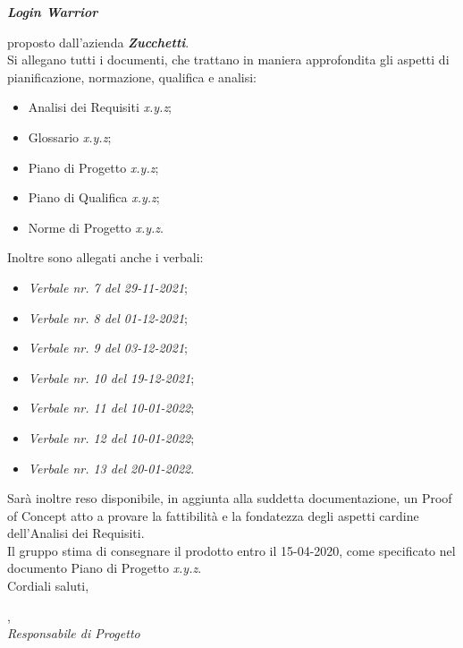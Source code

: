 \documentclass[a4paper, 12pt]{letter}
\begin{document}
\begin{letter}
        \begin{center}
           \textbf{\textit{Login Warrior}} 
        \end{center}
        proposto dall'azienda \textbf{\textit{Zucchetti}}.\\
        Si allegano tutti i documenti, che trattano in maniera approfondita gli aspetti di pianificazione, normazione, qualifica e analisi:
        \begin{itemize}
        	\item Analisi dei Requisiti \textit{x.y.z};
            \item Glossario \textit{x.y.z};
            \item Piano di Progetto \textit{x.y.z};
            \item Piano di Qualifica \textit{x.y.z};
            \item Norme di Progetto \textit{x.y.z}.
        \end{itemize}
        Inoltre sono allegati anche i verbali:
        \begin{itemize}
            \item \textit{Verbale nr. 7 del 29-11-2021};
            \item \textit{Verbale nr. 8 del 01-12-2021};
            \item \textit{Verbale nr. 9 del 03-12-2021};
            \item \textit{Verbale nr. 10 del 19-12-2021};
            \item \textit{Verbale nr. 11 del 10-01-2022};
            \item \textit{Verbale nr. 12 del 10-01-2022};
            \item \textit{Verbale nr. 13 del 20-01-2022}.
        \end{itemize}
        Sarà inoltre reso disponibile, in aggiunta alla suddetta documentazione, un Proof of Concept atto a provare la fattibilità e la fondatezza degli aspetti cardine dell'Analisi dei Requisiti. \\
        Il gruppo stima di consegnare il prodotto entro il 15-04-2020, come specificato nel documento Piano di Progetto \textit{x.y.z}.\\

        Cordiali saluti,
        \begin{flushright}
        	\closing{, \\ \textit{Responsabile di Progetto}} 
        \end{flushright}
    \end{letter}
\end{document}
